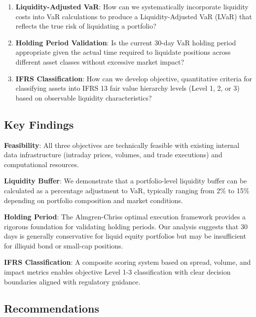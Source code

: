 \documentclass[11pt,a4paper]{article}
\begin{document}
\begin{enumerate}
    \item \textbf{Liquidity-Adjusted VaR}: How can we systematically incorporate liquidity costs into VaR calculations to produce a Liquidity-Adjusted VaR (LVaR) that reflects the true risk of liquidating a portfolio?

    \item \textbf{Holding Period Validation}: Is the current 30-day VaR holding period appropriate given the actual time required to liquidate positions across different asset classes without excessive market impact?

    \item \textbf{IFRS Classification}: How can we develop objective, quantitative criteria for classifying assets into IFRS 13 fair value hierarchy levels (Level 1, 2, or 3) based on observable liquidity characteristics?
\end{enumerate}

\subsection{Key Findings}

\textbf{Feasibility}: All three objectives are technically feasible with existing internal data infrastructure (intraday prices, volumes, and trade executions) and computational resources.

\textbf{Liquidity Buffer}: We demonstrate that a portfolio-level liquidity buffer can be calculated as a percentage adjustment to VaR, typically ranging from 2\% to 15\% depending on portfolio composition and market conditions.

\textbf{Holding Period}: The Almgren-Chriss optimal execution framework provides a rigorous foundation for validating holding periods. Our analysis suggests that 30 days is generally conservative for liquid equity portfolios but may be insufficient for illiquid bond or small-cap positions.

\textbf{IFRS Classification}: A composite scoring system based on spread, volume, and impact metrics enables objective Level 1-3 classification with clear decision boundaries aligned with regulatory guidance.

\subsection{Recommendations}
\end{document}
